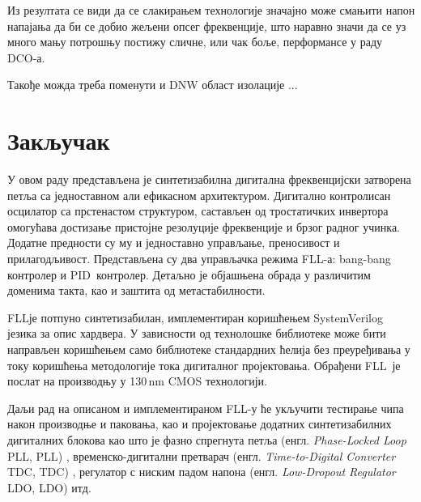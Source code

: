 \documentclass[master]{finthesis}
\makeatletter
\newcommand*{\engl}[2][\@empty]{%
    \edef\theacronym{#1}%
    (енгл. \foreignlanguage{english}{\emph{#2}%
    \ifx\theacronym\@empty \else , #1\fi})%
}
\def \FLL  {FLL} %
\def \DCO  {DCO} %
\def \PID  {PID} %
\makeatother
\begin{document}
Из резултата се види да се слакирањем технологије значајно може смањити напон напајања да би се добио жељени опсег фреквенције, што наравно значи да се уз много мању потрошњу постижу сличне, или чак боље, перформансе у раду \DCO-а. \par
Такође можда треба поменути и DNW област изолације ...






\section{Закључак} \label{Conclusion}
У овом раду представљена је синтетизабилна дигитална фреквенцијски затворена петља са једноставном али ефикасном архитектуром. Дигитално контролисан осцилатор са прстенастом структуром, састављен од тростатичких инвертора омогућава достизање пристојне резолуције фреквенције и брзог радног учинка. Додатне предности су му и једноставно управљање, преносивост и прилагодљивост. Представљена су два управљачка режима \FLL-а: bang-bang контролер и \PID\ контролер. Детаљно је објашњена обрада у различитим доменима такта, као и заштита од метастабилности. \par
\FLL је потпуно синтетизабилан, имплементиран коришћењем SystemVerilog језика за опис хардвера. У зависности од технолошке библиотеке може бити направљен коришћењем само библиотеке стандардних ћелија без преуређивања у току коришћења методологије тока дигиталног пројектовања. Обрађени \FLL\ је послат на производњу у 130\,nm CMOS технологији. \par
Даљи рад на описаном и имплементираном \FLL-у ће укључити тестирање чипа након производње и паковања, као и пројектовање додатних синтетизабилних дигиталних блокова као што је фазно спрегнута петља \engl[PLL]{Phase-Locked Loop}, временско-дигитални претварач \engl[TDC]{Time-to-Digital Converter}, регулатор с ниским падом напона \engl[LDO]{Low-Dropout Regulator} итд.


\makebibliography

\newrefsection
\nocite{*}
{\let\section\oldsection
\printbibliography[keyword=Frequency-locked loop, heading=bibintoc, title={Објављени радови}, resetnumbers]}
\end{document}
